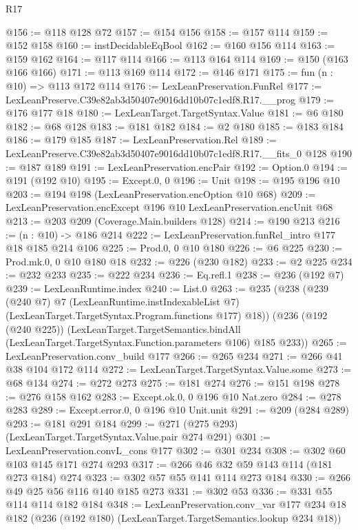 \begin{lexlean}{R17}
\begin{coremodule}
@156 := @118 @128 @72
@157 := @154 @156
@158 := @157 @114
@159 := @152 @158
@160 := instDecidableEqBool
@162 := @160 @156 @114
@163 := @159 @162
@164 := @117 @114
@166 := @113 @164 @114
@169 := @150 (@163 @166 @166)
@171 := @113 @169 @114
@172 := @146 @171
@175 := fun (n : @10) => @113 @172 @114
@176 := LexLeanPreservation.FunRel
@177 := LexLeanPreserve.C39e82ab3d50407e9016dd10b07c1edf8.R17.__prog
@179 := @176 @177 @18
@180 := LexLeanTarget.TargetSyntax.Value
@181 := @6 @180
@182 := @68 @128
@183 := @181 @182
@184 := @2 @180
@185 := @183 @184
@186 := @179 @185
@187 := LexLeanPreservation.Rel
@189 := LexLeanPreserve.C39e82ab3d50407e9016dd10b07c1edf8.R17.__fits_0 @128
@190 := @187 @189
@191 := LexLeanPreservation.encPair
@192 := Option.{0}
@194 := @191 (@192 @10)
@195 := Except.{0, 0}
@196 := Unit
@198 := @195 @196 @10
@203 := @194 @198 (LexLeanPreservation.encOption @10 @68)
@209 := LexLeanPreservation.encExcept @196 @10 LexLeanPreservation.encUnit @68
@213 := @203 @209 (Coverage.Main.builders @128)
@214 := @190 @213
@216 := (n : @10) -> @186 @214
@222 := LexLeanPreservation.funRel_intro @177 @18 @185 @214 @106
@225 := Prod.{0, 0} @10 @180
@226 := @6 @225
@230 := Prod.mk.{0, 0} @10 @180 @18
@232 := @226 (@230 @182)
@233 := @2 @225
@234 := @232 @233
@235 := @222 @234
@236 := Eq.refl.{1}
@238 := @236 (@192 @7)
@239 := LexLeanRuntime.index
@240 := List.{0}
@263 := @235
    (@238
      (@239
        (@240 @7)
        @7
        (LexLeanRuntime.instIndexableList @7)
        (LexLeanTarget.TargetSyntax.Program.functions @177)
        @18))
    (@236
      (@192 (@240 @225))
      (LexLeanTarget.TargetSemantics.bindAll
        (LexLeanTarget.TargetSyntax.Function.parameters @106)
        @185
        @233))
@265 := LexLeanPreservation.conv_build @177
@266 := @265 @234
@271 := @266 @41 @38 @104 @172 @114
@272 := LexLeanTarget.TargetSyntax.Value.some
@273 := @68 @134
@274 := @272 @273
@275 := @181 @274
@276 := @151 @198
@278 := @276 @158 @162
@283 := Except.ok.{0, 0} @196 @10 Nat.zero
@284 := @278 @283
@289 := Except.error.{0, 0} @196 @10 Unit.unit
@291 := @209 (@284 @289)
@293 := @181 @291 @184
@299 := @271 (@275 @293) (LexLeanTarget.TargetSyntax.Value.pair @274 @291)
@301 := LexLeanPreservation.convL_cons @177
@302 := @301 @234
@308 := @302 @60 @103 @145 @171 @274 @293
@317 := @266 @46 @32 @59 @143 @114 (@181 @273 @184) @274
@323 := @302 @57 @55 @141 @114 @273 @184
@330 := @266 @49 @25 @56 @116 @140 @185 @273
@331 := @302 @53
@336 := @331 @55 @114 @114 @182 @184
@348 := LexLeanPreservation.conv_var
    @177
    @234
    @18
    @182
    (@236 (@192 @180) (LexLeanTarget.TargetSemantics.lookup @234 @18))

\end{coremodule}
\end{lexlean}
